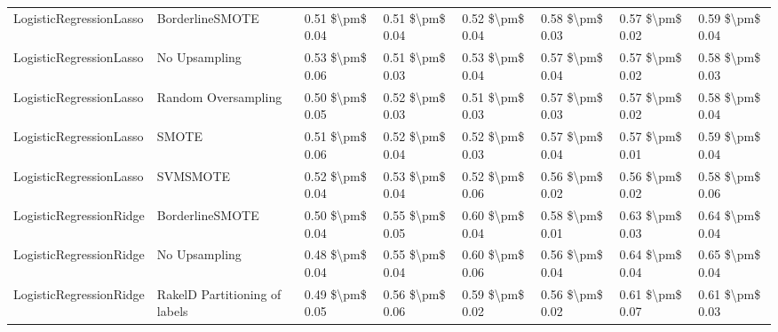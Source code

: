 \begin{tabular}{llllllll}
        LogisticRegressionLasso &               BorderlineSMOTE & 0.51 \$\textbackslash pm\$ 0.04 &           0.51 \$\textbackslash pm\$ 0.04 &       0.52 \$\textbackslash pm\$ 0.04 &        0.58 \$\textbackslash pm\$ 0.03 &                         0.57 \$\textbackslash pm\$ 0.02 &     0.59 \$\textbackslash pm\$ 0.04 \\
        LogisticRegressionLasso &                 No Upsampling & 0.53 \$\textbackslash pm\$ 0.06 &           0.51 \$\textbackslash pm\$ 0.03 &       0.53 \$\textbackslash pm\$ 0.04 &        0.57 \$\textbackslash pm\$ 0.04 &                         0.57 \$\textbackslash pm\$ 0.02 &     0.58 \$\textbackslash pm\$ 0.03 \\
        LogisticRegressionLasso &           Random Oversampling & 0.50 \$\textbackslash pm\$ 0.05 &           0.52 \$\textbackslash pm\$ 0.03 &       0.51 \$\textbackslash pm\$ 0.03 &        0.57 \$\textbackslash pm\$ 0.03 &                         0.57 \$\textbackslash pm\$ 0.02 &     0.58 \$\textbackslash pm\$ 0.04 \\
        LogisticRegressionLasso &                         SMOTE & 0.51 \$\textbackslash pm\$ 0.06 &           0.52 \$\textbackslash pm\$ 0.04 &       0.52 \$\textbackslash pm\$ 0.03 &        0.57 \$\textbackslash pm\$ 0.04 &                         0.57 \$\textbackslash pm\$ 0.01 &     0.59 \$\textbackslash pm\$ 0.04 \\
        LogisticRegressionLasso &                      SVMSMOTE & 0.52 \$\textbackslash pm\$ 0.04 &           0.53 \$\textbackslash pm\$ 0.04 &       0.52 \$\textbackslash pm\$ 0.06 &        0.56 \$\textbackslash pm\$ 0.02 &                         0.56 \$\textbackslash pm\$ 0.02 &     0.58 \$\textbackslash pm\$ 0.06 \\
        LogisticRegressionRidge &               BorderlineSMOTE & 0.50 \$\textbackslash pm\$ 0.04 &           0.55 \$\textbackslash pm\$ 0.05 &       0.60 \$\textbackslash pm\$ 0.04 &        0.58 \$\textbackslash pm\$ 0.01 &                         0.63 \$\textbackslash pm\$ 0.03 &     0.64 \$\textbackslash pm\$ 0.04 \\
        LogisticRegressionRidge &                 No Upsampling & 0.48 \$\textbackslash pm\$ 0.04 &           0.55 \$\textbackslash pm\$ 0.04 &       0.60 \$\textbackslash pm\$ 0.06 &        0.56 \$\textbackslash pm\$ 0.04 &                         0.64 \$\textbackslash pm\$ 0.04 &     0.65 \$\textbackslash pm\$ 0.04 \\
        LogisticRegressionRidge & RakelD Partitioning of labels & 0.49 \$\textbackslash pm\$ 0.05 &           0.56 \$\textbackslash pm\$ 0.06 &       0.59 \$\textbackslash pm\$ 0.02 &        0.56 \$\textbackslash pm\$ 0.02 &                         0.61 \$\textbackslash pm\$ 0.07 &     0.61 \$\textbackslash pm\$ 0.03 \\

\end{tabular}
